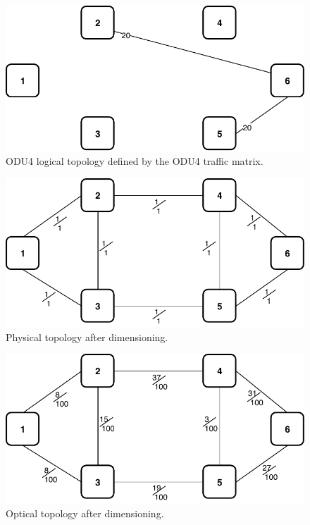 \begin{figure}[h!]
\centering
\includegraphics[width=12cm]{sdf/ilp/opaque_survivability/figures/logical_topology_ODU4_high}
\caption{ODU4 logical topology defined by the ODU4 traffic matrix.}
\label{logical_ODU4_high}
\end{figure}
\newpage
\begin{figure}[h!]
\centering
\includegraphics[width=13cm]{sdf/ilp/opaque_survivability/figures/physical_topology}
\caption{Physical topology after dimensioning.}
\label{physical_high}
\end{figure}

\vspace{25pt}

\begin{figure}[h!]
\centering
\includegraphics[width=13cm]{sdf/ilp/opaque_survivability/figures/optical_topology_high}
\caption{Optical topology after dimensioning.}
\label{optical_high}
\end{figure}

